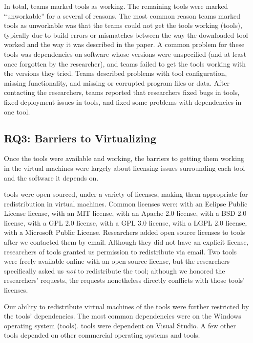 \documentclass[10pt,conference]{IEEEtran}
\begin{document}
In total, teams marked \working tools as working.
The remaining tools were marked ``unworkable'' for a 
several of reasons.
The most common reason teams marked tools as unworkable
was that the teams could not get the tools 
working (\unworkCouldntWorkIt tools),
typically due to build errors or mismatches between
the way the downloaded tool worked and the way 
it was described in the paper.
A common problem for these tools was dependencies on
software whose versions were unspecified 
(and at least once forgotten by the researcher), and teams
failed to get the tools working with the versions they
tried.
Teams described problems with 
tool configuration,
missing functionality, and
missing or corrupted program files or data.
After contacting the researchers, teams reported that researchers 
fixed bugs in \contactFixBug tools,
fixed deployment issues in \contactFixDepl tools,
and fixed some problems with dependencies in one tool.

\subsection{RQ3: Barriers to Virtualizing}

Once the tools were available and working, 
the barriers to getting them working in the
virtual machines were largely about licensing issues
surrounding each tool and the software it depends on.

\redistPermissionArtifact tools were open-sourced, 
under a variety of licenses, making them appropriate
for redistribution in virtual machines.
Common licenses were:
\licenseEPL with an Eclipse Public License license,
\licenseMIT with an MIT license,
\licenseApache with an Apache 2.0 license,
\licenseBSD with a BSD 2.0 license,
\licenseGPL with a GPL 2.0 license,
\licenseGPLThree with a GPL 3.0 license,
\licenseLGPL with a LGPL 2.0 license,
\licenseMPL with a Microsoft Public License.
Researchers added open source licenses to \contactOSSed tools
after we contacted them by email.	
Although they did not have an explicit license,
researchers of \redistPermissionEmail tools granted us
permission to redistribute via email.
Two tools were freely available online
with an open source license, but the researchers
specifically asked us \emph{not} to redistribute the
tool; although we honored the researchers' requests,
the requests nonetheless directly conflicts
with those tools' licenses.  

Our ability to redistribute virtual machines of the tools were
further restricted by the tools' dependencies.
The most common dependencies were on the Windows 
operating system (\depWindows tools).
\depVS tools were dependent on Visual Studio.
A few other tools depended on other commercial 
operating systems and tools.
 
\end{document}

